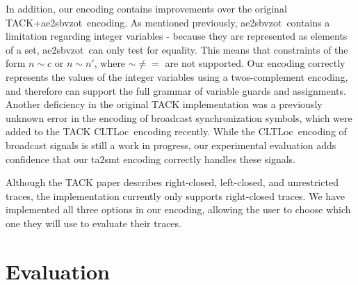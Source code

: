\documentclass[a4paper,11pt]{report}
\theoremstyle{definition}
\newcommand{\cltloc}{CLTLoc}
\newcommand{\aez}{ae2sbvzot}
\begin{document}
In addition, our encoding contains improvements over the original TACK+\aez\
encoding. As mentioned previously, \aez\ contains a limitation regarding integer
variables - because they are represented as elements of a set, \aez\ can only
test for equality. This means that constraints of the form $n \sim c$ or
$n \sim n'$, where $\sim \neq =$ are not supported. Our encoding correctly
represents the values of the integer variables using a twos-complement encoding,
and therefore can support the full grammar of variable guards and assignments.
Another deficiency in the original TACK implementation was a previously unknown
error in the encoding of broadcast synchronization symbols, which were added to
the TACK \cltloc\ encoding recently. While the \cltloc\ encoding of broadcast
signals is still a work in progress, our experimental evaluation adds confidence
that our ta2smt encoding correctly handles these signals.


Although the TACK paper describes right-closed, left-closed, and unrestricted
traces, the implementation currently only supports right-closed traces. We have
implemented all three options in our encoding, allowing the user to choose which
one they will use to evaluate their traces.

\chapter{Evaluation}\label{evaluation}
\end{document}
